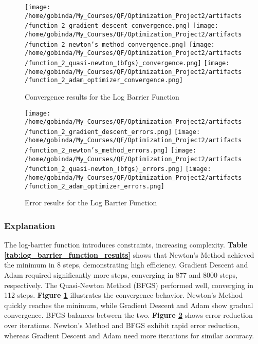 \documentclass[12pt]{article}
\begin{document}
\begin{figure}[htbp]
   \centering
   \texttt{[image: /home/gobinda/My\_Courses/QF/Optimization\_Project2/artifacts/function\_2\_gradient\_descent\_convergence.png]}
   \texttt{[image: /home/gobinda/My\_Courses/QF/Optimization\_Project2/artifacts/function\_2\_newton's\_method\_convergence.png]}
   \texttt{[image: /home/gobinda/My\_Courses/QF/Optimization\_Project2/artifacts/function\_2\_quasi-newton\_(bfgs)\_convergence.png]}
   \texttt{[image: /home/gobinda/My\_Courses/QF/Optimization\_Project2/artifacts/function\_2\_adam\_optimizer\_convergence.png]}
   \caption{\small Convergence results for the Log Barrier Function}
   \label{fig:log_barrier_function_convergence}
\end{figure}

\begin{figure}[htbp]
   \centering
   \texttt{[image: /home/gobinda/My\_Courses/QF/Optimization\_Project2/artifacts/function\_2\_gradient\_descent\_errors.png]}
   \texttt{[image: /home/gobinda/My\_Courses/QF/Optimization\_Project2/artifacts/function\_2\_newton's\_method\_errors.png]}
   \texttt{[image: /home/gobinda/My\_Courses/QF/Optimization\_Project2/artifacts/function\_2\_quasi-newton\_(bfgs)\_errors.png]}
   \texttt{[image: /home/gobinda/My\_Courses/QF/Optimization\_Project2/artifacts/function\_2\_adam\_optimizer\_errors.png]}
   \caption{\small Error results for the Log Barrier Function}
   \label{fig:log_barrier_function_errors}
\end{figure}

\FloatBarrier %

\subsubsection*{Explanation}
The log-barrier function introduces constraints, increasing complexity. \textbf{Table \ref{tab:log_barrier_function_results}} shows that Newton's Method achieved the minimum in 8 steps, demonstrating high efficiency. Gradient Descent and Adam required significantly more steps, converging in 877 and 8000 steps, respectively. The Quasi-Newton Method (BFGS) performed well, converging in 112 steps.
\textbf{Figure \ref{fig:log_barrier_function_convergence}} illustrates the convergence behavior. Newton's Method quickly reaches the minimum, while Gradient Descent and Adam show gradual convergence. BFGS balances between the two.
\textbf{Figure \ref{fig:log_barrier_function_errors}} shows error reduction over iterations. Newton's Method and BFGS exhibit rapid error reduction, whereas Gradient Descent and Adam need more iterations for similar accuracy.
\end{document}
